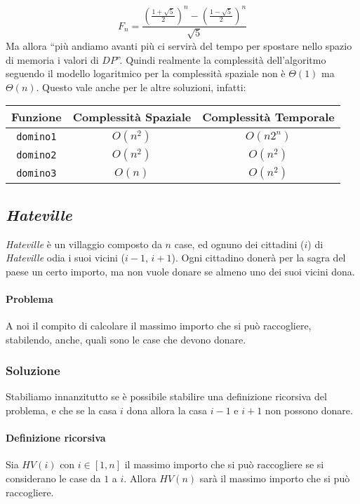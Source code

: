             $$
                F_n = \frac{\left(\frac{1+\sqrt{5}}{2}\right)^n - \left(\frac{1-\sqrt{5}}{2}\right)^n}{\sqrt{5}}
            $$
            Ma allora ``più andiamo avanti più ci servirà del tempo per spostare nello spazio di memoria i valori di $DP$''. Quindi realmente la complessità dell'algoritmo seguendo il modello logaritmico per la complessità spaziale non è $\Theta(1)$ ma $\Theta(n)$. Questo vale anche per le altre soluzioni, infatti:
            \begin{table}[H]
                \centering
                \begin{tabular}{|c|c|c|}
                    \hline
                    \textbf{Funzione} & \textbf{Complessità Spaziale} & \textbf{Complessità Temporale} \\
                    \hline
                    \texttt{domino1} & $O(n^2)$ & $O(n2^n)$ \\
                    \hline
                    \texttt{domino2} & $O(n^2)$ & $O(n^2)$ \\
                    \hline
                    \texttt{domino3} & $O(n)$ & $O(n^2)$ \\
                    \hline
                \end{tabular}
            \end{table}
        \subsection{\textit{Hateville}}
            \textit{Hateville} è un villaggio composto da $n$ case, ed ognuno dei cittadini ($i$) di \textit{Hateville} odia i suoi vicini ($i-1$, $i+1$). Ogni cittadino donerà per la sagra del paese un certo importo, ma non vuole donare se almeno uno dei suoi vicini dona.
            \paragraph{Problema} A noi il compito di calcolare il massimo importo che si può raccogliere, stabilendo, anche, quali sono le case che devono donare.
            \subsubsection{Soluzione} 
                Stabiliamo innanzitutto se è possibile stabilire una definizione ricorsiva del problema, e che se la casa $i$ dona allora la casa $i-1$ e $i+1$ non possono donare.
                \paragraph{Definizione ricorsiva}
                    Sia $HV(i)$ con $i\in [1,n]$ il massimo importo che si può raccogliere se si considerano le case da $1$ a $i$. Allora $HV(n)$ sarà il massimo importo che si può raccogliere.

